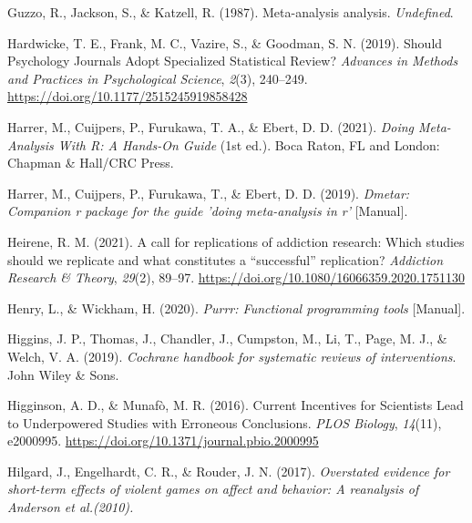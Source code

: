 \documentclass[
  man,floatsintext]{apa6}
\newlength{\cslhangindent}
\newlength{\cslentryspacingunit} %
\newenvironment{CSLReferences}[2] %
 {%
  \setlength{\parindent}{0pt}
  \ifodd #1
  \let\oldpar\par
  \def\par{\hangindent=\cslhangindent\oldpar}
  \fi
  \setlength{\parskip}{#2\cslentryspacingunit}
 }%
 {}
\begin{document}
\begin{CSLReferences}{1}{0}
\leavevmode{}%
Guzzo, R., Jackson, S., \& Katzell, R. (1987). Meta-analysis analysis. \emph{Undefined}.

\leavevmode{}%
Hardwicke, T. E., Frank, M. C., Vazire, S., \& Goodman, S. N. (2019). Should {Psychology Journals Adopt Specialized Statistical Review}? \emph{Advances in Methods and Practices in Psychological Science}, \emph{2}(3), 240--249. \url{https://doi.org/10.1177/2515245919858428}

\leavevmode{}%
Harrer, M., Cuijpers, P., Furukawa, T. A., \& Ebert, D. D. (2021). \emph{Doing {Meta-Analysis With R}: {A Hands-On Guide}} (1st ed.). {Boca Raton, FL and London}: {Chapman \& Hall/CRC Press}.

\leavevmode{}%
Harrer, M., Cuijpers, P., Furukawa, T., \& Ebert, D. D. (2019). \emph{Dmetar: {Companion} r package for the guide 'doing meta-analysis in r'} {[}Manual{]}.

\leavevmode{}%
Heirene, R. M. (2021). A call for replications of addiction research: Which studies should we replicate and what constitutes a {``successful''} replication? \emph{Addiction Research \& Theory}, \emph{29}(2), 89--97. \url{https://doi.org/10.1080/16066359.2020.1751130}

\leavevmode{}%
Henry, L., \& Wickham, H. (2020). \emph{Purrr: {Functional} programming tools} {[}Manual{]}.

\leavevmode{}%
Higgins, J. P., Thomas, J., Chandler, J., Cumpston, M., Li, T., Page, M. J., \& Welch, V. A. (2019). \emph{Cochrane handbook for systematic reviews of interventions}. {John Wiley \& Sons}.

\leavevmode{}%
Higginson, A. D., \& Munafò, M. R. (2016). Current {Incentives} for {Scientists Lead} to {Underpowered Studies} with {Erroneous Conclusions}. \emph{PLOS Biology}, \emph{14}(11), e2000995. \url{https://doi.org/10.1371/journal.pbio.2000995}

\leavevmode{}%
Hilgard, J., Engelhardt, C. R., \& Rouder, J. N. (2017). \emph{Overstated evidence for short-term effects of violent games on affect and behavior: {A} reanalysis of {Anderson} et al.(2010).}


\end{CSLReferences}
\end{document}
